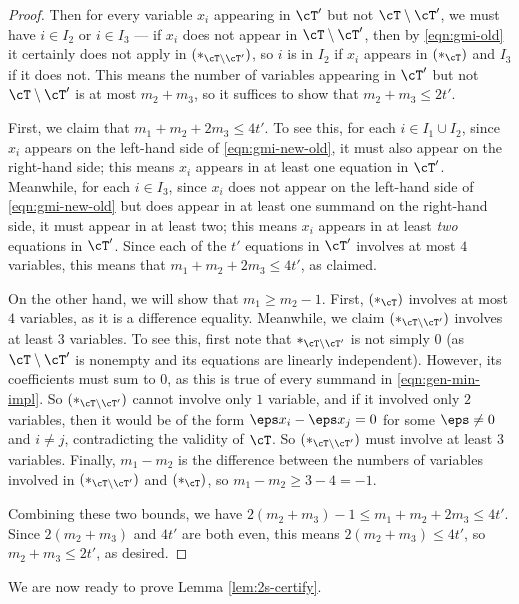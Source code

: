 \begin{proof}
    Then for every variable $x_i$ appearing in $\cT'$ but not $\cT \setminus \cT'$, we must have $i \in I_2$ or $i \in I_3$ --- if $x_i$ does not appear in $\cT \setminus \cT'$, then by \eqref{eqn:gmi-old} it certainly does not apply in $(*_{\cT \setminus \cT'})$, so $i$ is in $I_2$ if $x_i$ appears in $(*_\cT)$ and $I_3$ if it does not. This means the number of variables appearing in $\cT'$ but not $\cT \setminus \cT'$ is at most $m_2 + m_3$, so it suffices to show that $m_2 + m_3 \leq 2t'$. 

    First, we claim that $m_1 +  m_2 + 2m_3 \leq 4t'$. To see this, for each $i \in I_1 \cup I_2$, since $x_i$ appears on the left-hand side of \eqref{eqn:gmi-new-old}, it must also appear on the right-hand side; this means $x_i$ appears in at least one equation in $\cT'$. Meanwhile, for each $i \in I_3$, since $x_i$ does not appear on the left-hand side of \eqref{eqn:gmi-new-old} but does appear in at least one summand on the right-hand side, it must appear in at least two; this means $x_i$ appears in at least \emph{two} equations in $\cT'$. Since each of the $t'$ equations in $\cT'$ involves at most $4$ variables, this means that $m_1 + m_2 + 2m_3 \leq 4t'$, as claimed. 

    On the other hand, we will show that $m_1 \geq m_2 - 1$. First, $(*_\cT)$ involves at most $4$ variables, as it is a difference equality. Meanwhile, we claim $(*_{\cT \setminus \cT'})$ involves at least $3$ variables. To see this, first note that $*_{\cT \setminus \cT'}$ is not simply $0$ (as $\cT \setminus \cT'$ is nonempty and its equations are linearly independent). However, its coefficients must sum to $0$, as this is true of every summand in \eqref{eqn:gen-min-impl}. So $(*_{\cT \setminus \cT'})$ cannot involve only $1$ variable, and if it involved only $2$ variables, then it would be of the form $\eps x_i - \eps x_j = 0$ for some $\eps \neq 0$ and $i \neq j$, contradicting the validity of $\cT$. So $(*_{\cT \setminus \cT'})$ must involve at least $3$ variables. Finally, $m_1 - m_2$ is the difference between the numbers of variables involved in $(*_{\cT \setminus \cT'})$ and $(*_\cT)$, so $m_1 - m_2 \geq 3 - 4 = -1$. 

    Combining these two bounds, we have $2(m_2 + m_3) - 1 \leq m_1 + m_2 + 2m_3 \leq 4t'$. Since $2(m_2 + m_3)$ and $4t'$ are both even, this means $2(m_2 + m_3) \leq 4t'$, so $m_2 + m_3 \leq 2t'$, as desired. 
\end{proof}

We are now ready to prove Lemma \ref{lem:2s-certify}. 

